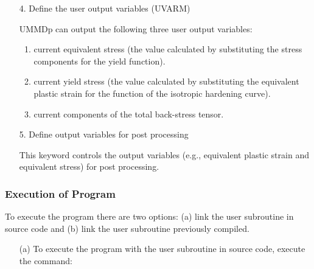 \documentclass[11pt,a4paper,twoside,final,onecolumn,titlepage]{article}
\begin{document}
\begin{enumerate}
	\item[4.] Define the user output variables (UVARM)
	\item[] UMMDp can output the following three user output variables:
	\begin{enumerate}
		\item current equivalent stress (the value calculated by substituting the stress components for the yield function).
		\item current yield stress (the value calculated by substituting the equivalent plastic strain for the function of the isotropic hardening curve).
		\item current components of the total back-stress tensor.\\		
	\end{enumerate}
		\par
		\texttt{}	
		\par\bigskip
\end{enumerate}

\begin{enumerate}
	\item[5.] Define output variables for post processing
	\item[] This keyword controls the output variables (e.g., equivalent plastic strain and equivalent stress) for post processing.\\
		\par
		\texttt{}	
		\par\bigskip
\end{enumerate}

\subsubsection{Execution of Program}
To execute the program there are two options: (a) link the user subroutine in source code and (b) link the user subroutine previously compiled.

\begin{enumerate}
	\item[(a)] To execute the program with the user subroutine in source code, execute the command:\\
	\par
	\texttt{}	
	\par\bigskip
\end{enumerate}
\end{document}

